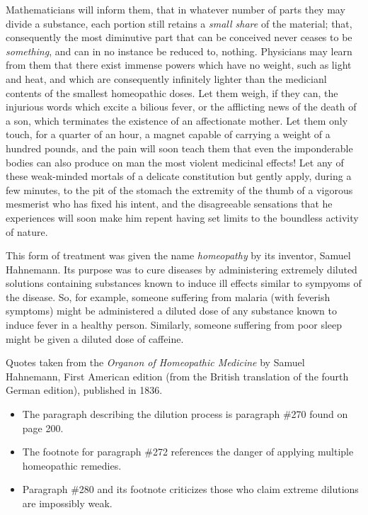 \vskip 10pt {\narrower \noindent \baselineskip5pt

Mathematicians will inform them, that in whatever number of parts they may divide a substance, each portion still retains a {\it small share} of the material; that, consequently the most diminutive part that can be conceived never ceases to be {\it something}, and can in no instance be reduced to, nothing.  Physicians may learn from them that there exist immense powers which have no weight, such as light and heat, and which are consequently infinitely lighter than the medicianl contents of the smallest homeopathic doses.  Let them weigh, if they can, the injurious words which excite a bilious fever, or the afflicting news of the death of a son, which terminates the existence of an affectionate mother.  Let them only touch, for a quarter of an hour, a magnet capable of carrying a weight of a hundred pounds, and the pain will soon teach them that even the imponderable bodies can also produce on man the most violent medicinal effects!  Let any of these weak-minded mortals of a delicate constitution but gently apply, during a few minutes, to the pit of the stomach the extremity of the thumb of a vigorous mesmerist who has fixed his intent, and the disagreeable sensations that he experiences will soon make him repent having set limits to the boundless activity of nature.

\par} \vskip 10pt









This form of treatment was given the name {\it homeopathy} by its inventor, Samuel Hahnemann.  Its purpose was to cure diseases by administering extremely diluted solutions containing substances known to induce ill effects similar to sympyoms of the disease.  So, for example, someone suffering from malaria (with feverish symptoms) might be administered a diluted dose of any substance known to induce fever in a healthy person.  Similarly, someone suffering from poor sleep might be given a diluted dose of caffeine.

Quotes taken from the {\it Organon of Homeopathic Medicine} by Samuel Hahnemann, First American edition (from the British translation of the fourth German edition), published in 1836.

\begin{itemize}
\item{} The paragraph describing the dilution process is paragraph \#270 found on page 200.
\item{} The footnote for paragraph \#272 references the danger of applying multiple homeopathic remedies.
\item{} Paragraph \#280 and its footnote criticizes those who claim extreme dilutions are impossibly weak.
\end{itemize}






